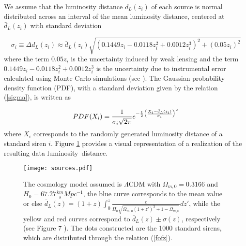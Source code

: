 \documentclass[universe,article,accept,moreauthors,pdftex]{Definitions/mdpi}
\begin{document}
We  assume that the luminosity distance $d_{L}(z_{i})$ of each source is normal distributed across an interval of the mean luminosity distance, centered at $\bar{d}_{L}(z_{i})$ with standard deviation \cite{Belgacem_2018,Zhao_2011,Sathyaprakash:2009xt}

  \begin{equation}\label{sigma}
  \sigma_{i}\equiv \Delta d_{L}(z_{i})\approx \bar{d}_{L}(z_{i}) \sqrt{(0.1449 z_{i} - 0.0118 z_{i}^2 + 0.0012 z_{i}^3)^2 + (0.05 z_{i})^2}
  \end{equation} 
where the term $0.05 z_{i}$ is the uncertainty induced by weak lensing \cite{Sathyaprakash:2009xt} and the term $0.1449 z_{i} - 0.0118 z_{i}^2 + 0.0012 z_{i}^3$ is the uncertainty due to instrumental error calculated using Monte Carlo simulations (see \cite{Zhao_2011}). The Gaussian probability density function (PDF), with a standard deviation given by the relation (\ref{sigma}), is written as

\begin{equation}
  PDF(X_{i})=\frac{1}{\sigma_{i}\sqrt{2\pi}} e^{-\frac{1}{2}\big{(}\frac{X_{i}-\bar{d}_{L}(z_{i})}{\sigma_{i}}\big{)}^{2}}
\end{equation}
where $X_{i}$ corresponds to the randomly generated luminosity distance of a standard siren $i$.  Figure \ref{z2} provides a visual representation of a realization of the resulting data \mbox{luminosity distance.}
 
 \begin{figure}[H] 
    \texttt{[image: sources.pdf]}
    \caption{{The} %
 cosmology model assumed is $\Lambda$CDM with $\Omega_{m,0}=0.3166$ and $H_{0}=67.27 \frac{km}{s}Mpc^{-1}$, the blue curve corresponds to the mean value or else $\bar{d}_L(z) = (1 + z) \int_{0}^{z} \frac{c}{H_0 \sqrt{\Omega_{m,0} (1+z')^3 + 1-\Omega_{m,0}}}  dz'$, while the yellow and red curves correspond to $\bar{d}_{L}(z)\pm \sigma(z)$,  respectively (see {Figure 7 \cite{Belgacem_2018}} %
). The dots constructed are the 1000 standard sirens, which are distributed through the relation (\ref{fofz}).}
    \label{z2}
\end{figure}
\end{document}
